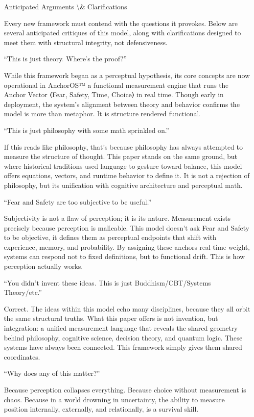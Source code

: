 \documentclass[12pt]{article}
\begin{document}
Anticipated Arguments \textbackslash{}& Clarifications

Every new framework must contend with the questions it provokes. Below are several anticipated critiques of this model, along with clarifications designed to meet them with structural integrity, not defensiveness.

“This is just theory. Where’s the proof?”

While this framework began as a perceptual hypothesis, its core concepts are now operational in AnchorOS™ a functional measurement engine that runs the Anchor Vector ⟨Fear, Safety, Time, Choice⟩ in real time. Though early in deployment, the system’s alignment between theory and behavior confirms the model is more than metaphor. It is structure rendered functional.

“This is just philosophy with some math sprinkled on.”

If this reads like philosophy, that’s because philosophy has always attempted to measure the structure of thought. This paper stands on the same ground, but where historical traditions used language to gesture toward balance, this model offers equations, vectors, and runtime behavior to define it. It is not a rejection of philosophy, but its unification with cognitive architecture and perceptual math.

“Fear and Safety are too subjective to be useful.”

Subjectivity is not a flaw of perception; it is its nature. Measurement exists precisely because perception is malleable. This model doesn’t ask Fear and Safety to be objective, it defines them as perceptual endpoints that shift with experience, memory, and probability. By assigning these anchors real-time weight, systems can respond not to fixed definitions, but to functional drift. This is how perception actually works.

“You didn’t invent these ideas. This is just Buddhism/CBT/Systems Theory/etc.”

Correct. The ideas within this model echo many disciplines, because they all orbit the same structural truths. What this paper offers is not invention, but integration: a unified measurement language that reveals the shared geometry behind philosophy, cognitive science, decision theory, and quantum logic. These systems have always been connected. This framework simply gives them shared coordinates.

“Why does any of this matter?”

Because perception collapses everything.
Because choice without measurement is chaos.
Because in a world drowning in uncertainty, the ability to measure position internally, externally, and relationally, is a survival skill.
\end{document}
